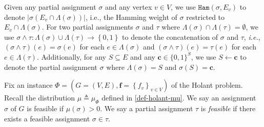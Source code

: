 \documentclass[11pt]{article}
\newcommand{\abs}[1]{\left\vert#1\right\vert}
\newcommand{\set}[1]{\left\{#1\right\}}
\def\!#1{\mathtt{#1}}
\def\IE{\emph{i.e.}}
\newcommand{\Ham}{\!{Ham}}
\newcommand{\vecf}{\boldsymbol{f}}
\newcommand{\hktodo}[1]{{\color{blue}{#1}}}
\begin{document}
Given any partial assignment $\sigma$ and any vertex $v \in V$, we use $\Ham(\sigma, E_v)$ to denote $\abs{\sigma(E_v \cap \Lambda(\sigma))}$, i.e., the Hamming weight of $\sigma$ restricted to $E_v \cap \Lambda(\sigma)$.
For two partial assignments $\sigma$ and $\tau$ where $\Lambda(\sigma)\cap \Lambda(\tau) = \emptyset$, we use $\sigma \land \tau : \Lambda(\sigma) \cup \Lambda(\tau) \to \set{0, 1}$ to denote the concatenation of $\sigma$ and $\tau$, \IE, $(\sigma \land \tau)(e)=\sigma(e)$ for each $e\in \Lambda(\sigma)$ and $(\sigma \land \tau)(e)=\tau(e)$ for each $e\in \Lambda(\tau)$. 
{Additionally, for any $S\subseteq E$ and any $\boldsymbol{c} \in \{0,1\}^S$, we use $S \gets \boldsymbol{c}$ to denote the partial assignment $\sigma$ where $\Lambda(\sigma) = S$ and $\sigma(S) = \boldsymbol{c}$.}

Fix an instance $ \Phi = \left(G = (V, E), \vecf = \set{f_v}_{v \in V}\right)$ of the Holant problem.
Recall the distribution $\mu \triangleq \mu_{\Phi}$ defined in \eqref{def-holant-mu}.
We say an assignment $\sigma$ of $G$ is feasible if $\mu(\sigma)>0$. 
We say a partial assignment $\tau$ is \emph{feasible} if there exists a feasible assignment $\sigma\in \tau$.




 

\end{document}
